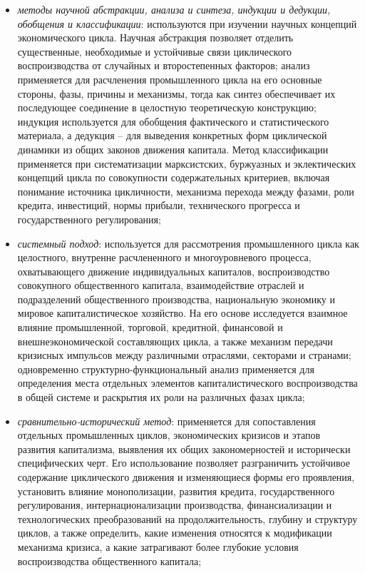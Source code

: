 \begin{itemize}
    \item \textit{методы научной абстракции, анализа и синтеза, индукции и дедукции, обобщения и классификации}: используются при изучении научных концепций экономического цикла. Научная абстракция позволяет отделить существенные, необходимые и устойчивые связи циклического воспроизводства от случайных и второстепенных факторов; анализ применяется для расчленения промышленного цикла на его основные стороны, фазы, причины и механизмы, тогда как синтез обеспечивает их последующее соединение в целостную теоретическую конструкцию; индукция используется для обобщения фактического и статистического материала, а дедукция – для выведения конкретных форм циклической динамики из общих законов движения капитала. Метод классификации применяется при систематизации марксистских, буржуазных и эклектических концепций цикла по совокупности содержательных критериев, включая понимание источника цикличности, механизма перехода между фазами, роли кредита, инвестиций, нормы прибыли, технического прогресса и государственного регулирования;
    \item \textit{системный подход}: используется для рассмотрения промышленного цикла как целостного, внутренне расчлененного и многоуровневого процесса, охватывающего движение индивидуальных капиталов, воспроизводство совокупного общественного капитала, взаимодействие отраслей и подразделений общественного производства, национальную экономику и мировое капиталистическое хозяйство. На его основе исследуется взаимное влияние промышленной, торговой, кредитной, финансовой и внешнеэкономической составляющих цикла, а также механизм передачи кризисных импульсов между различными отраслями, секторами и странами; одновременно структурно-функциональный анализ применяется для определения места отдельных элементов капиталистического воспроизводства в общей системе и раскрытия их роли на различных фазах цикла;
    \item \textit{сравнительно-исторический метод}: применяется для сопоставления отдельных промышленных циклов, экономических кризисов и этапов развития капитализма, выявления их общих закономерностей и исторически специфических черт. Его использование позволяет разграничить устойчивое содержание циклического движения и изменяющиеся формы его проявления, установить влияние монополизации, развития кредита, государственного регулирования, интернационализации производства, финансиализации и технологических преобразований на продолжительность, глубину и структуру циклов, а также определить, какие изменения относятся к модификации механизма кризиса, а какие затрагивают более глубокие условия воспроизводства общественного капитала;

\end{itemize}

